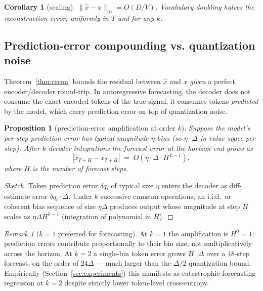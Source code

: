 \documentclass[11pt]{article}
\newtheorem{proposition}[theorem]{Proposition}
\newtheorem{corollary}[theorem]{Corollary}
\theoremstyle{remark}
\newtheorem{remark}[theorem]{Remark}
\begin{document}
\begin{corollary}[scaling]
$\|\hat x - x\|_\infty = O(D/V)$. Vocabulary doubling halves the
reconstruction error, uniformly in $T$ and for any $k$.
\end{corollary}

\subsection{Prediction-error compounding vs. quantization noise}
\label{sec:pred-compound}

Theorem~\ref{thm:recon} bounds the residual between $\hat x$ and $x$
\emph{given} a perfect encoder/decoder round-trip. In autoregressive
forecasting, the decoder does not consume the exact encoded tokens of
the true signal; it consumes tokens \emph{predicted} by the model,
which carry prediction error on top of quantization noise.

\begin{proposition}[prediction-error amplification at order $k$]
\label{prop:pred}
Suppose the model's per-step prediction error has typical magnitude
$\eta$ bins (so $\eta \cdot \Delta$ in value space per step). After $k$
decoder integrations the forecast error at the horizon end grows as
\begin{equation}
|\hat x_{T+H} - x_{T+H}| \;=\; O\!\left(\eta \cdot \Delta \cdot H^{\,k-1}\right),
\end{equation}
where $H$ is the number of forecast steps.
\end{proposition}

\begin{proof}[Sketch]
Token prediction error $\delta q_t$ of typical size $\eta$ enters the
decoder as diff-estimate error $\delta q_t \cdot \Delta$. Under $k$
successive cumsum operations, an i.i.d.\ or coherent bias sequence of
size $\eta \Delta$ produces output whose magnitude at step $H$ scales
as $\eta \Delta H^{k-1}$ (integration of polynomial in $H$).
\end{proof}

\begin{remark}[$k=1$ preferred for forecasting]
At $k=1$ the amplification is $H^0 = 1$: prediction errors contribute
proportionally to their bin size, not multiplicatively across the
horizon. At $k=2$ a single-bin token error grows $H \cdot \Delta$ over
a 48-step forecast, on the order of $24 \Delta$ --- much larger than
the $\Delta/2$ quantization bound. Empirically (Section~\ref{sec:experiments})
this manifests as catastrophic forecasting regression at $k=2$ despite
strictly lower token-level cross-entropy.
\end{remark}
\end{document}
